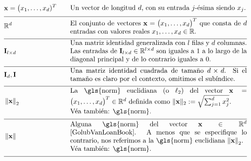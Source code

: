 \begin{align} 
	&\featurevec=\big(\feature_{1}, \ldots, \feature_{\featuredim})^{T} &\quad & \parbox{.75\textwidth}{Un vector de longitud $\featuredim$, con su 
		entrada $\featureidx$-ésima siendo $\feature_{\featureidx}$.} \nonumber \\[2mm] \hline \nonumber\\[-5mm]
	&\mathbb{R}^{\featuredim} & \quad &  \parbox{.75\textwidth}{El conjunto de vectores $\featurevec=\big(\feature_{1}, \ldots, \feature_{\featurelen}\big)^{T}$ que consta de 
		$\featuredim$ entradas con valores reales $\feature_{1}, \ldots, \feature_{\featurelen} \in \mathbb{R}$.} \nonumber \\[2mm] \hline \nonumber\\[-5mm]
	&\mathbf{I}_{\modelidx \times \featuredim}  & \quad &  \parbox{.75\textwidth}{Una matriz identidad generalizada 
		con $\modelidx$ filas y $\featuredim$ columnas. Las entradas de $\mathbf{I}_{\modelidx \times \featuredim} \in \mathbb{R}^{\modelidx \times \featuredim}$ 
		son iguales a $1$ a lo largo de la diagonal principal y de lo contrario iguales a $0$.} \nonumber \\[2mm] \hline \nonumber\\[-5mm]
	&\mathbf{I}_{\dimlocalmodel}, \mathbf{I} & \quad &  \parbox{.75\textwidth}{Una matriz identidad 
		cuadrada de tamaño $\dimlocalmodel \times \dimlocalmodel$. Si el tamaño es claro por 
		el contexto, omitimos el subíndice.} \nonumber \\[2mm] \hline \nonumber\\[-5mm]
	&\normgeneric{\featurevec}{2}  &\quad & \parbox{.75\textwidth}{La \gls{norm} euclidiana (o $\ell_{2}$) del vector 
		$\featurevec=\big(\feature_{1}, \ldots, \feature_{\featurelen}\big)^{T} \in \mathbb{R}^{\featuredim}$ definida como 
		$\| \featurevec \|_{2} \defeq \sqrt{\sum_{\featureidx=1}^{\featuredim} \feature_{\featureidx}^{2}}$.
		\\ Véa también: \gls{norm}.} \nonumber \\[2mm] \hline \nonumber\\[-5mm] 
	&\normgeneric{\featurevec}{}  & \quad &  \parbox{.75\textwidth}{Alguna \gls{norm} del vector $\featurevec \in \mathbb{R}^{\featuredim}$ \cite{GolubVanLoanBook}. 
		A menos que se especifique lo contrario, nos referimos a la \gls{norm} euclidiana $\normgeneric{\featurevec}{2}$.
		\\ Véa también: \gls{norm}.} \nonumber \\[2mm] \hline \nonumber\\[-5mm]

\end{align}
